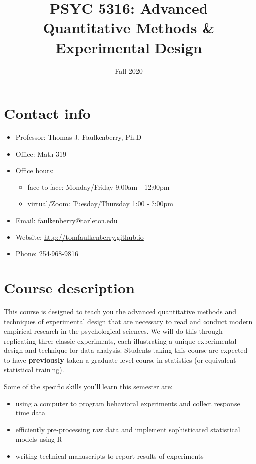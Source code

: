 \documentclass[10pt]{article}
\date{Fall 2020}
\title{PSYC 5316: Advanced Quantitative Methods \& Experimental Design}
\begin{document}
\maketitle

\section*{Contact info}
\label{sec:org71d6a31}
\begin{itemize}
\item Professor: Thomas J. Faulkenberry, Ph.D
\item Office: Math 319
\item Office hours: 
\begin{itemize}
\item face-to-face: Monday/Friday 9:00am - 12:00pm
\item virtual/Zoom: Tuesday/Thursday 1:00 - 3:00pm
\end{itemize}
\item Email: faulkenberry@tarleton.edu
\item Website: \url{http://tomfaulkenberry.github.io}
\item Phone: 254-968-9816
\end{itemize}

\section*{Course description}
\label{sec:orgee584ff}

This course is designed to teach you the advanced quantitative methods and techniques of experimental design that are necessary to read and conduct modern empirical research in the psychological sciences. We will do this through replicating three classic experiments, each illustrating a unique experimental design and technique for data analysis.  Students taking this course are expected to have \textbf{previously} taken a graduate level course in statistics (or equivalent statistical training). 

Some of the specific skills you'll learn this semester are:
\begin{itemize}
\item using a computer to program behavioral experiments and collect response time data
\item efficiently pre-processing raw data and implement sophisticated statistical models using R
\item writing technical manuscripts to report results of experiments
\end{itemize}
\end{document}
